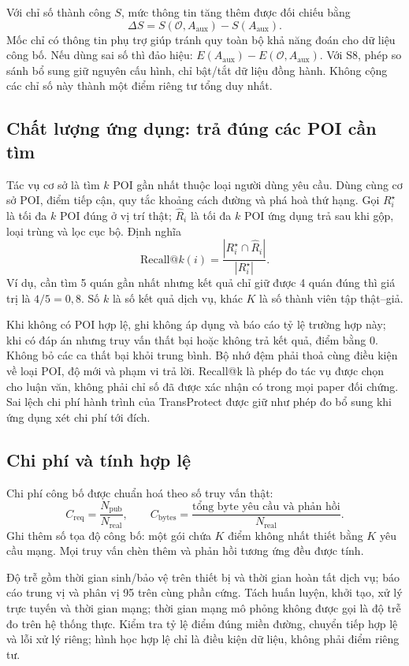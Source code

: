 \documentclass[12pt,a4paper,oneside]{report}
\begin{document}
Với chỉ số thành công $S$, mức thông tin tăng thêm được đối chiếu bằng
\[
\Delta S=S(\mathcal O,A_{\mathrm{aux}})-S(A_{\mathrm{aux}}).
\]
Mốc chỉ có thông tin phụ trợ giúp tránh quy toàn bộ khả năng đoán cho dữ liệu công bố. Nếu dùng sai số thì đảo hiệu: $E(A_{\mathrm{aux}})-E(\mathcal O,A_{\mathrm{aux}})$. Với S8, phép so sánh bổ sung giữ nguyên cấu hình, chỉ bật/tắt dữ liệu đồng hành. Không cộng các chỉ số này thành một điểm riêng tư tổng duy nhất.

\subsection{Chất lượng ứng dụng: trả đúng các POI cần tìm}

Tác vụ cơ sở là tìm $k$ POI gần nhất thuộc loại người dùng yêu cầu. Dùng cùng cơ sở POI, điểm tiếp cận, quy tắc khoảng cách đường và phá hoà thứ hạng. Gọi $R_i^\star$ là tối đa $k$ POI đúng ở vị trí thật; $\widehat R_i$ là tối đa $k$ POI ứng dụng trả sau khi gộp, loại trùng và lọc cục bộ. Định nghĩa
\[
\mathrm{Recall@}k(i)=
\frac{|R_i^\star\cap\widehat R_i|}{|R_i^\star|}.
\]
Ví dụ, cần tìm 5 quán gần nhất nhưng kết quả chỉ giữ được 4 quán đúng thì giá trị là $4/5=0{,}8$. Số $k$ là số kết quả dịch vụ, khác $K$ là số thành viên tập thật--giả.

Khi không có POI hợp lệ, ghi không áp dụng và báo cáo tỷ lệ trường hợp này; khi có đáp án nhưng truy vấn thất bại hoặc không trả kết quả, điểm bằng 0. Không bỏ các ca thất bại khỏi trung bình. Bộ nhớ đệm phải thoả cùng điều kiện về loại POI, độ mới và phạm vi trả lời. Recall@k là phép đo tác vụ được chọn cho luận văn, không phải chỉ số đã được xác nhận có trong mọi paper đối chứng. Sai lệch chi phí hành trình của TransProtect được giữ như phép đo bổ sung khi ứng dụng xét chi phí tới đích.

\subsection{Chi phí và tính hợp lệ}

Chi phí công bố được chuẩn hoá theo số truy vấn thật:
\[
C_{\mathrm{req}}=\frac{N_{\mathrm{pub}}}{N_{\mathrm{real}}},
\qquad
C_{\mathrm{bytes}}=
\frac{\text{tổng byte yêu cầu và phản hồi}}{N_{\mathrm{real}}}.
\]
Ghi thêm số tọa độ công bố: một gói chứa $K$ điểm không nhất thiết bằng $K$ yêu cầu mạng. Mọi truy vấn chèn thêm và phản hồi tương ứng đều được tính.

Độ trễ gồm thời gian sinh/bảo vệ trên thiết bị và thời gian hoàn tất dịch vụ; báo cáo trung vị và phân vị 95 trên cùng phần cứng. Tách huấn luyện, khởi tạo, xử lý trực tuyến và thời gian mạng; thời gian mạng mô phỏng không được gọi là độ trễ đo trên hệ thống thực. Kiểm tra tỷ lệ điểm đúng miền đường, chuyển tiếp hợp lệ và lỗi xử lý riêng; hình học hợp lệ chỉ là điều kiện dữ liệu, không phải điểm riêng tư.
\end{document}
